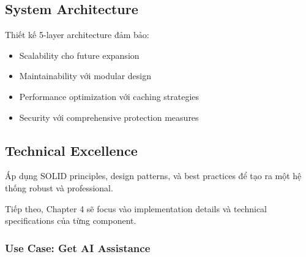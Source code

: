 \subsection{System Architecture}
Thiết kế 5-layer architecture đảm bảo:
\begin{itemize}
    \item Scalability cho future expansion
    \item Maintainability với modular design
    \item Performance optimization với caching strategies
    \item Security với comprehensive protection measures
\end{itemize}

\subsection{Technical Excellence}
Áp dụng SOLID principles, design patterns, và best practices để tạo ra một hệ thống robust và professional.

Tiếp theo, Chapter 4 sẽ focus vào implementation details và technical specifications của từng component.

\subsubsection{Use Case: Get AI Assistance}

